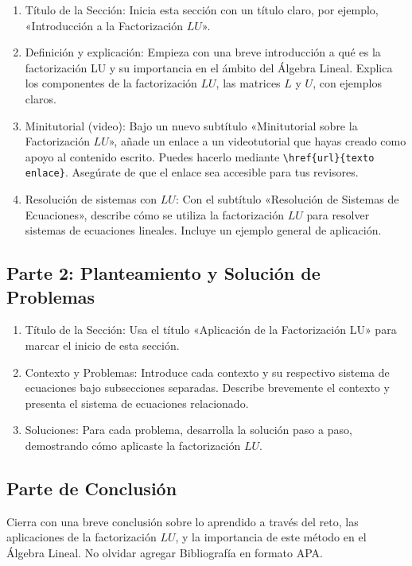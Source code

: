 \documentclass[a4,11pt]{aleph-notas}
\begin{document}
\begin{enumerate}
\item 
    Título de la Sección: Inicia esta sección con un título claro, por ejemplo, «Introducción a la Factorización $LU$».
\item 
    Definición y explicación: Empieza con una breve introducción a qué es la factorización LU y su importancia en el ámbito del Álgebra Lineal. Explica los componentes de la factorización $LU$, las matrices $L$ y $U$, con ejemplos claros. 
\item 
    Minitutorial (video): Bajo un nuevo subtítulo «Minitutorial sobre la Factorización $LU$», añade un enlace a un videotutorial que hayas creado como apoyo al contenido escrito. Puedes hacerlo mediante \verb+\href{url}{texto enlace}+. Asegúrate de que el enlace sea accesible para tus revisores.
\item 
    Resolución de sistemas con $LU$: Con el subtítulo «Resolución de Sistemas de Ecuaciones», describe cómo se utiliza la factorización $LU$ para resolver sistemas de ecuaciones lineales. Incluye un ejemplo general de aplicación.
\end{enumerate}

\subsection{Parte 2: Planteamiento y Solución de Problemas}

\begin{enumerate}
\item 
    Título de la Sección: Usa el título «Aplicación de la Factorización LU» para marcar el inicio de esta sección.
\item 
    Contexto y Problemas: Introduce cada contexto y su respectivo sistema de ecuaciones bajo subsecciones separadas. Describe brevemente el contexto y presenta el sistema de ecuaciones relacionado.
\item 
    Soluciones: Para cada problema, desarrolla la solución paso a paso, demostrando cómo aplicaste la factorización $LU$.
\end{enumerate}

\subsection{Parte de Conclusión}
   
   Cierra con una breve conclusión sobre lo aprendido a través del reto, las aplicaciones de la factorización $LU$, y la importancia de este método en el Álgebra Lineal. No olvidar agregar Bibliografía en formato APA.
\end{document}

